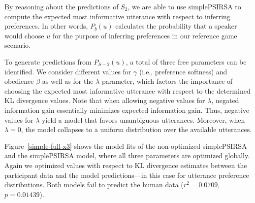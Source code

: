 \documentclass[10pt,a4paper]{article}
\newcommand{\gcs}[1]{\textcolor{blue}{[gcs: #1]}}
\begin{document}
By reasoning about the predictions of $S_2$, we are able to use simplePSIRSA to compute the expected most informative utterance with respect to inferring preferences. In other words, $P_b(u)$ calculates the probability that a speaker would choose $u$ for the purpose of inferring preferences in our reference game scenario.

To generate predictions from $P_{S-2}(u)$, a total of three free parameters can be identified. 
We consider different values for $\gamma$ (i.e., preference softness) and obedience $\beta$ as well as for the $\lambda$ parameter, which factors the importance of choosing the expected most informative utterance with respect to the determined KL divergence values.
Note that when allowing negative values for $\lambda$, negated information gain essentially minimizes expected information gain.
Thus, negative values for $\lambda$ yield a model that favors unambiguous utterances. 
Moreover, when $\lambda=0$, the model collapses to a uniform distribution over the available utterances.



Figure~\ref{simple-full-x3} shows the model fits of the non-optimized simplePSIRSA and the simplePSIRSA model, 
where all three parameters are optimized globally. 
Again we optimized values with respect to KL divergence estimates between the participant data and the model predictions---in this case for utterance preference distributions.
Both models fail to predict the human data ($r^2=0.0709$, $p=0.01439$).

\end{document}
